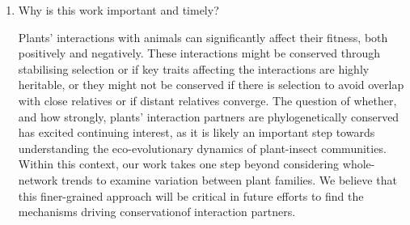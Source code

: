\documentclass[12pt]{letter}
\begin{document}
\begin{letter}
\begin{enumerate}
		\smallskip

	
		\item Why is this work important and timely?
		\smallskip


		Plants' interactions with animals can significantly affect their fitness, both positively and negatively. These interactions might be conserved through stabilising selection or if key traits affecting the interactions are highly heritable, or they might not be conserved if there is selection to avoid overlap with close relatives or if distant relatives converge. The question of whether, and how strongly, plants' interaction partners are phylogenetically conserved has excited continuing interest, as it is likely an important step towards understanding the eco-evolutionary dynamics of plant-insect communities. Within this context, our work takes one step beyond considering whole-network trends to examine variation between plant families. We believe that this finer-grained approach will be critical in future efforts to find the mechanisms driving conservationof interaction partners.







\end{enumerate}
\end{letter}
\end{document}
